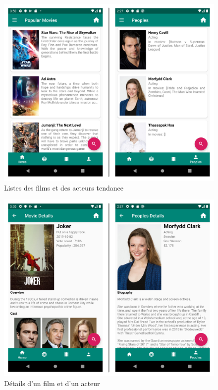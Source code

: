 \begin{figure}
    \begin{center}
        \includegraphics[width=1\textwidth]{img/screenshots/movies_peoples_list.png}
    \end{center}
    \caption{Listes des films et des acteurs tendance}
    \label{movies_peoples_list}
\end{figure}
\begin{figure}
    \begin{center}
        \includegraphics[width=1\textwidth]{img/screenshots/movie_people_details.png}
    \end{center}
    \caption{Détails d'un film et d'un acteur}
    \label{movie_people_details}
\end{figure}

